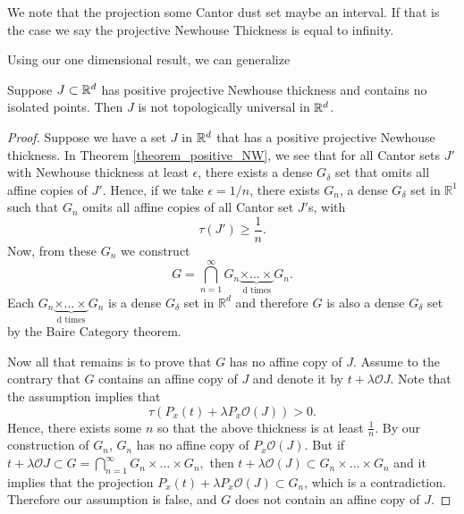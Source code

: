 We note that the projection some Cantor dust set maybe an interval.  If that is the case we say the projective Newhouse Thickness is equal to infinity.  


Using our one dimensional result, we can generalize 
\begin{theorem}Suppose $J \subset \mathbb{R}^d$ has positive projective Newhouse thickness and contains no isolated points. Then $J$ is not topologically universal in $\mathbb{R}^d$. 
\end{theorem}

\begin{proof}  Suppose we have a set $J$ in $\mathbb{R}^d$ that has a positive projective Newhouse thickness. In Theorem \ref{theorem_positive_NW}, we see that for all Cantor sets $J'$ with Newhouse thickness at least $\epsilon$, there exists a dense $G_{\delta}$ set that omits all affine copies of $J'$. Hence, if we take $\epsilon = 1/n$,  there exists $G_n$, a dense $G_{\delta}$ set in ${\mathbb R}^1$ such that $G_n$ omits all affine copies of all Cantor set $J'$s, with $$\tau(J') \geq \frac{1}{n}.$$
Now, from these $G_n$ we construct
$$
G = \bigcap_{n=1}^\infty G_n\underbrace{\times \dots \times}_\text{d times}G_n. 
$$
Each $G_n\underbrace{\times \dots \times}_\text{d times}G_n $ is a dense $G_\delta$ set in ${\mathbb R}^d$ and therefore $G$ is also a dense $G_\delta$ set by the Baire Category theorem.  

Now all that remains is to prove that $G$ has no affine copy of $J$.   Assume to the contrary that $G$ contains an affine copy of $J$ and denote it by $t+\lambda \mathcal{O}J$. Note that the assumption implies that 
$$
\tau(P_x(t) + \lambda P_x\mathcal{O}(J))> 0.
$$
Hence, there exists some $n$ so that the above thickness is at least $\frac{1}{n}.$ By our construction of $G_n$, $G_n$ has no affine copy of $P_x\mathcal{O}(J)$.  But if $t + \lambda \mathcal{O}J \subset G = \bigcap_{n=1}^\infty G_n \times \dots \times G_n,$ then $t+\lambda \mathcal{O}(J) \subset G_n \times \dots \times G_n$ and it implies that the projection $P_x(t) + \lambda P_x\mathcal{O}(J) \subset G_n$, which is a contradiction.  Therefore our assumption is false, and $G$ does not contain an affine copy of $J$.  \end{proof}